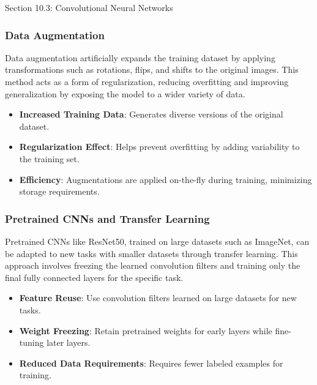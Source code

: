 \begin{notes}{Section 10.3: Convolutional Neural Networks}
    \subsubsection*{Data Augmentation}
    
    Data augmentation artificially expands the training dataset by applying transformations such as rotations, flips, and shifts to the original images. This method acts as a form of regularization, reducing 
    overfitting and improving generalization by exposing the model to a wider variety of data.
    
    \begin{highlight}
        \begin{itemize}
            \item \textbf{Increased Training Data}: Generates diverse versions of the original dataset.
            \item \textbf{Regularization Effect}: Helps prevent overfitting by adding variability to the training set.
            \item \textbf{Efficiency}: Augmentations are applied on-the-fly during training, minimizing storage requirements.
        \end{itemize}
    \end{highlight}
    
    \subsubsection*{Pretrained CNNs and Transfer Learning}
    
    Pretrained CNNs like ResNet50, trained on large datasets such as ImageNet, can be adapted to new tasks with smaller datasets through transfer learning. This approach involves freezing the learned 
    convolution filters and training only the final fully connected layers for the specific task.
    
    \begin{highlight}
        \begin{itemize}
            \item \textbf{Feature Reuse}: Use convolution filters learned on large datasets for new tasks.
            \item \textbf{Weight Freezing}: Retain pretrained weights for early layers while fine-tuning later layers.
            \item \textbf{Reduced Data Requirements}: Requires fewer labeled examples for training.
        \end{itemize}
    \end{highlight}
\end{notes}

